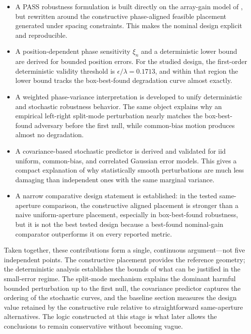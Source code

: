 \begin{itemize}
\item A PASS robustness formulation is built directly on the array-gain model of \cite{ouyang2025array}, but rewritten around the constructive phase-aligned feasible placement generated under spacing constraints. This makes the nominal design explicit and reproducible.
\item A position-dependent phase sensitivity $\xi_n$ and a deterministic lower bound are derived for bounded position errors. For the studied design, the first-order deterministic validity threshold is $\epsilon/\lambda = 0.1713$, and within that region the lower bound tracks the box-best-found degradation curve almost exactly.
\item A weighted phase-variance interpretation is developed to unify deterministic and stochastic robustness behavior. The same object explains why an empirical left-right split-mode perturbation nearly matches the box-best-found adversary before the first null, while common-bias motion produces almost no degradation.
\item A covariance-based stochastic predictor is derived and validated for iid uniform, common-bias, and correlated Gaussian error models. This gives a compact explanation of why statistically smooth perturbations are much less damaging than independent ones with the same marginal variance.
\item A narrow comparative design statement is established: in the tested same-aperture comparison, the constructive aligned placement is stronger than a naive uniform-aperture placement, especially in box-best-found robustness, but it is not the best tested design because a best-found nominal-gain comparator outperforms it on every reported metric.
\end{itemize}

Taken together, these contributions form a single, continuous argument—not five independent points. The constructive placement provides the reference geometry; the deterministic analysis establishes the bounds of what can be justified in the small-error regime. The split-mode mechanism explains the dominant harmful bounded perturbation up to the first null, the covariance predictor captures the ordering of the stochastic curves, and the baseline section measures the design value retained by the constructive rule relative to straightforward same-aperture alternatives. The logic constructed at this stage is what later allows the conclusions to remain conservative without becoming vague.

